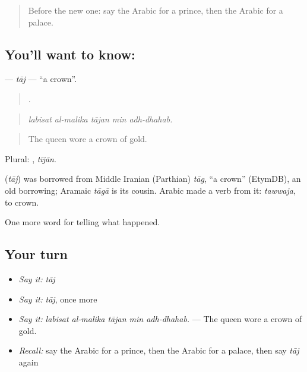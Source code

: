 \label{lesson:AR-C309-taj}



\begin{quote}
Before the new one: say the Arabic for a prince, then the Arabic for a palace.
\end{quote}

\subsection*{You'll want to know: }
\textbf{} — \emph{tāj} — \textquotedblleft{}a crown\textquotedblright{}.

\begin{quote}
    .
\end{quote}

\begin{quote}
\emph{labisat al-malika tājan min adh-dhahab.}
\end{quote}

\begin{quote}
The queen wore a crown of gold.
\end{quote}

Plural: , \emph{tījān}.

\begin{cousinweb}
\textbf{} (\emph{tāj}) was borrowed from Middle Iranian (Parthian) \emph{tāg}, \textquotedblleft{}a crown\textquotedblright{} (EtymDB), an old borrowing; Aramaic \emph{tāgā} is its cousin. Arabic made a verb from it: \emph{tawwaja}, to crown.
\end{cousinweb}

\begin{grammarlens}[title={What you've built}]
One more word for telling what happened.
\end{grammarlens}

\subsection*{Your turn}
\begin{itemize}
\raggedright
  \item \emph{Say it:} \emph{tāj}
  \item \emph{Say it:} \emph{tāj}, once more
  \item \emph{Say it:} \emph{labisat al-malika tājan min adh-dhahab.} — The queen wore a crown of gold.
  \item \emph{Recall:} say the Arabic for a prince, then the Arabic for a palace, then say \emph{tāj} again
\end{itemize}

